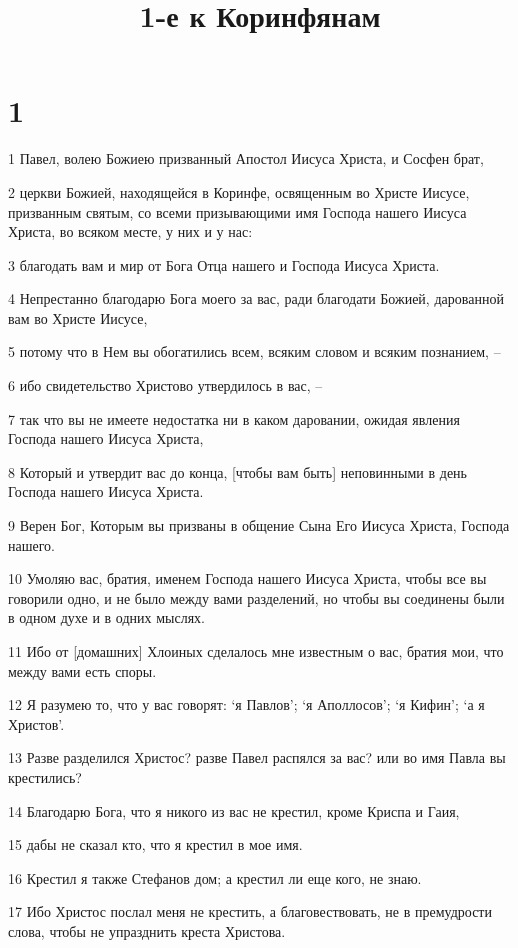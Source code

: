 

\title{1-е к Коринфянам}


\chapter{1}

\par 1 Павел, волею Божиею призванный Апостол Иисуса Христа, и Сосфен брат,
\par 2 церкви Божией, находящейся в Коринфе, освященным во Христе Иисусе, призванным святым, со всеми призывающими имя Господа нашего Иисуса Христа, во всяком месте, у них и у нас:
\par 3 благодать вам и мир от Бога Отца нашего и Господа Иисуса Христа.
\par 4 Непрестанно благодарю Бога моего за вас, ради благодати Божией, дарованной вам во Христе Иисусе,
\par 5 потому что в Нем вы обогатились всем, всяким словом и всяким познанием, --
\par 6 ибо свидетельство Христово утвердилось в вас, --
\par 7 так что вы не имеете недостатка ни в каком даровании, ожидая явления Господа нашего Иисуса Христа,
\par 8 Который и утвердит вас до конца, [чтобы вам быть] неповинными в день Господа нашего Иисуса Христа.
\par 9 Верен Бог, Которым вы призваны в общение Сына Его Иисуса Христа, Господа нашего.
\par 10 Умоляю вас, братия, именем Господа нашего Иисуса Христа, чтобы все вы говорили одно, и не было между вами разделений, но чтобы вы соединены были в одном духе и в одних мыслях.
\par 11 Ибо от [домашних] Хлоиных сделалось мне известным о вас, братия мои, что между вами есть споры.
\par 12 Я разумею то, что у вас говорят: `я Павлов'; `я Аполлосов'; `я Кифин'; `а я Христов'.
\par 13 Разве разделился Христос? разве Павел распялся за вас? или во имя Павла вы крестились?
\par 14 Благодарю Бога, что я никого из вас не крестил, кроме Криспа и Гаия,
\par 15 дабы не сказал кто, что я крестил в мое имя.
\par 16 Крестил я также Стефанов дом; а крестил ли еще кого, не знаю.
\par 17 Ибо Христос послал меня не крестить, а благовествовать, не в премудрости слова, чтобы не упразднить креста Христова.
